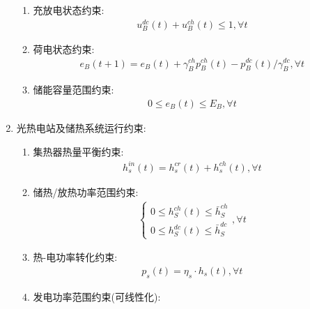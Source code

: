 \documentclass{article}
\begin{document}
\begin{enumerate}
{\begin{enumerate}
{\begin{align}
\begin{cases}
                        0\leq p_B^{dc}(t)\leq C_B\\
                        0\leq p_B^{ch}(t)\leq C_B
                    \end{cases},\forall t
                \end{align}
            }
            \item {充放电状态约束:
                \begin{align}
                    u_B^{dc}(t)+u_B^{ch}(t)\leq1,\forall t
                \end{align}
            }
            \item {荷电状态约束:
                \begin{align}
                    e_B(t+1){=}e_B(t){+}\gamma_B^{ch}p_B^{ch}(t){-}p_B^{dc}(t)/\gamma_B^{dc},\forall t
                \end{align}
            }
            \item {储能容量范围约束:
                \begin{align}
                    0\leq e_B(t)\leq E_B,\forall t
                \end{align}
            }
        \end{enumerate}
    }
    \item {光热电站及储热系统运行约束:
        \begin{enumerate}
            \item {集热器热量平衡约束:
                \begin{align}
                    h_{s}^{in}(t)=h_{s}^{cr}(t)+h_{s}^{ch}(t),\forall t
                \end{align}
            }
            \item {储热/放热功率范围约束:
                \begin{align}
                    \begin{cases}0\le h_S^{ch}(t)\le\bar{h}_S^{ch}\\0\le h_S^{dc}(t)\le\bar{h}_S^{dc}\end{cases},\forall t
                \end{align}
            }
            \item {热-电功率转化约束:
                \begin{align}
                    p_s(t)=\eta_s\cdot h_s(t),\forall t
                \end{align}
            }
            \item {发电功率范围约束({\color{red}可线性化}):
                \begin{align}

\end{align}}
\end{enumerate}}
\end{enumerate}
\end{document}

